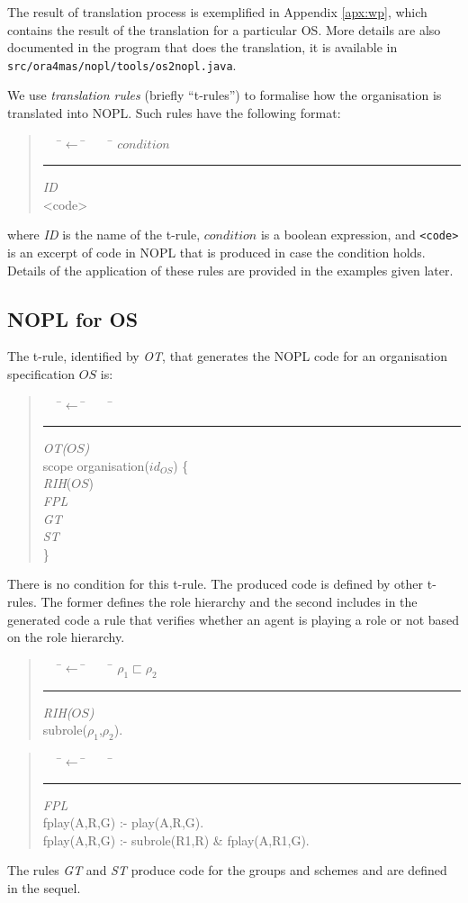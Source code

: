 \documentclass{article}
\newcommand{\subrole}{\sqsubset}
\newcommand{\code}[1]{\texttt{#1}}
\newenvironment{rwrule}[2]
{\begin{quote}\ttfamily\begin{tabbing}~~~\=$\leftarrow$ \= ~~~ \= \kill
     \ensuremath{#2}\\
     \rule[2pt]{6.5cm}{.3pt} \hfill \rwlabel{#1}\\}
{\end{tabbing}\end{quote}}
\newcommand{\rwlabel}[1]{{\scshape\itshape\textrm{#1}}}
\theoremstyle{definition} \newtheorem{definition}{Definition}
\begin{document}
The result of translation process is exemplified in Appendix
\ref{apx:wp}, which contains the result of the translation for a
particular OS. More details are also documented in the program that
does the translation, it is available in
\code{src/ora4mas/nopl/tools/os2nopl.java}.

\bigskip

We use \emph{translation rules} (briefly ``t-rules'') to formalise how
the organisation is translated into NOPL. Such rules have the
following format:

\begin{rwrule}{ID}
{condition}
<code>
\end{rwrule}
where \rwlabel{ID} is the name of the t-rule, $condition$ is
a boolean expression, and \code{<code>} is an excerpt of code in NOPL
that is produced in case the condition holds. Details of the
application of these rules are provided in the examples given later.

\subsection{NOPL for OS}

The t-rule, identified by \rwlabel{OT}, that generates the NOPL code
for an organisation specification $OS$ is:
\begin{rwrule}{OT($OS$)}
{ } 
scope organisation($id_{OS}$) \{ \\
   \> \rwlabel{RIH}($OS$)\\
   \> \rwlabel{FPL}\\
   \>  \rwlabel{GT}\\
   \>  \rwlabel{ST}\\
\}
\end{rwrule}
There is no condition for this t-rule. The produced code is defined by
other t-rules. The former defines the role hierarchy and the second
includes in the generated code a rule that verifies whether an agent
is playing a role or not based on the role hierarchy. 
\begin{rwrule}{RIH($OS$)}
{ \rho_1 \subrole \rho_2 } 
subrole($\rho_1$,$\rho_2$).
\end{rwrule}

\begin{rwrule}{FPL}
{ } 
fplay(A,R,G) :- play(A,R,G).\\
fplay(A,R,G) :- subrole(R1,R) \& fplay(A,R1,G).
\end{rwrule}

The rules \rwlabel{GT} and \rwlabel{ST} produce code for the groups
and schemes and are defined in the sequel.
\end{document}
